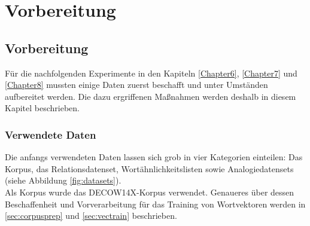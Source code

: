 
\chapter{Vorbereitung} %

\label{Chapter4} %


\section{Vorbereitung}

  Für die nachfolgenden Experimente in den Kapiteln \ref{Chapter6}, \ref{Chapter7} und \ref{Chapter8}
  mussten einige Daten zuerst beschafft und unter Umständen aufbereitet werden. Die  dazu ergriffenen Maßnahmen werden
  deshalb in diesem Kapitel beschrieben.

  \subsection{Verwendete Daten}

  Die anfangs verwendeten Daten lassen sich grob in vier Kategorien einteilen: Das Korpus, das Relationsdatenset,
  Wortähnlichkeitslisten sowie Analogiedatensets (siehe Abbildung \ref{fig:datasets}).\\
  Als Korpus wurde das \textsc{DECOW14X}-Korpus verwendet. Genaueres über dessen Beschaffenheit und Vorverarbeitung für das
  Training von Wortvektoren werden in \ref{sec:corpusprep} und \ref{sec:vectrain} beschrieben.

